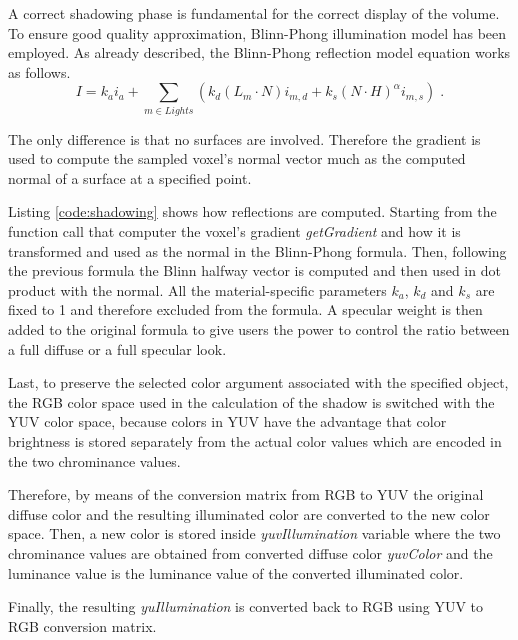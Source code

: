 \documentclass[12pt,a4paper]{extarticle}
\newcommand{\linespace}{\vspace{0pt}}
\begin{document}
A correct shadowing phase is fundamental for the correct display of the volume. To ensure good quality approximation, Blinn-Phong illumination model has been employed. As already described, the Blinn-Phong reflection model equation works as follows.
\[
I = k_{a} i_{a} + \sum_{m \in Lights} (k_{d}(L_{m} \cdot N)i_{m,d} +k_{s}(N \cdot H)^{\alpha}i_{m,s}) \;.
\]

The only difference is that no surfaces are involved. Therefore the gradient is used to compute the sampled voxel's normal vector much as the computed normal of a surface at a specified point.
\linespace

Listing \ref{code:shadowing} shows how reflections are computed. Starting from the function call that computer the voxel's gradient \textit{getGradient} and how it is transformed and used as the normal in the Blinn-Phong formula. Then, following the previous formula the Blinn halfway vector is computed and then used in dot product with the normal. All the material-specific parameters $k_{a}$, $k_{d}$ and $k_{s}$ are fixed to 1 and therefore excluded from the formula. A specular weight is then added to the original formula to give users the power to control the ratio between a full diffuse or a full specular look.
\linespace

Last, to preserve the selected color argument associated with the specified object, the RGB color space used in the calculation of the shadow is switched with the YUV color space, because colors in YUV have the advantage that color brightness is stored separately from the actual color values which are encoded in the two chrominance values.

Therefore, by means of the conversion matrix from RGB to YUV the original diffuse color and the resulting illuminated color are converted to the new color space. Then, a new color is stored inside \textit{yuvIllumination} variable where the two chrominance values are obtained from converted diffuse color \textit{yuvColor} and the luminance value is the luminance value of the converted illuminated color. 

Finally, the resulting \textit{yuIllumination} is converted back to RGB using YUV to RGB conversion matrix.
\end{document}
